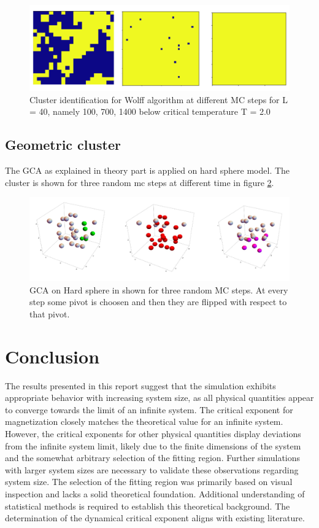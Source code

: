 \documentclass[a4paper,8pt]{article}
\begin{document}
\begin{figure}
    \centering
    \includegraphics[width=0.75\linewidth]{wolff.png}
    \caption{Cluster identification for Wolff algorithm at different MC steps for L = 40, namely 100, 700, 1400 below critical temperature T = 2.0}
    \label{fig:cluster_wolff}
\end{figure}

\subsection{Geometric cluster}
The GCA as explained in theory part is applied on hard sphere model. The cluster is shown for three random mc steps at different time in figure \ref{fig:enternewgcalabel}. 

\begin{figure}
    \centering
    \includegraphics[width=0.8\linewidth]{GCA.png}
    \caption{GCA on Hard sphere in shown for three random MC steps. At every step some pivot is choosen and then they are flipped with respect to that pivot.}
    \label{fig:enternewgcalabel}
\end{figure}

\section{Conclusion}
The results presented in this report suggest that the simulation exhibits appropriate behavior with increasing system size, as all physical quantities appear to converge towards the limit of an infinite system. The critical exponent for magnetization closely matches the theoretical value for an infinite system. However, the critical exponents for other physical quantities display deviations from the infinite system limit, likely due to the finite dimensions of the system and the somewhat arbitrary selection of the fitting region. Further simulations with larger system sizes are necessary to validate these observations regarding system size. The selection of the fitting region was primarily based on visual inspection and lacks a solid theoretical foundation. Additional understanding of statistical methods is required to establish this theoretical background. The determination of the dynamical critical exponent aligns with existing literature. \\
\end{document}
